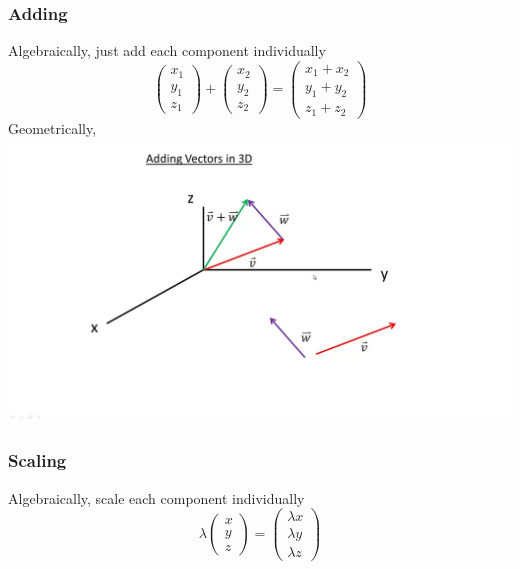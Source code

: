 \documentclass{article}
\begin{document}
\subsubsection{Adding}
Algebraically, just add each component individually
$$\left(
    \begin{array}{c}  
         x_1 \\
         y_1 \\
         z_1
    \end{array}
    \right) + \left(
    \begin{array}{c}  
         x_2 \\
         y_2 \\
         z_2
    \end{array}
    \right) = \left(
    \begin{array}{c}  
         x_1 + x_2 \\
         y_1 + y_2 \\
         z_1 + z_2
    \end{array}
    \right) 
$$
Geometrically, \\
\includegraphics[width=\linewidth]{images/addingvectors.jpg}
\subsubsection{Scaling}
Algebraically, scale each component individually
$$
\lambda \left(
    \begin{array}{c}  
         x \\
         y \\
         z
    \end{array}
    \right) = \left(
    \begin{array}{c}  
         \lambda x \\
         \lambda y \\
         \lambda z
    \end{array}
    \right)
$$
\end{document}
